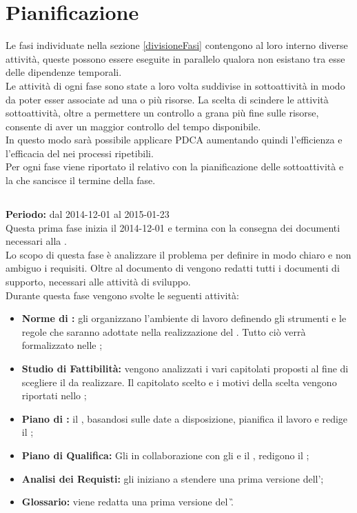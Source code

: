 \section{Pianificazione}\label{piana}
Le fasi individuate nella sezione \ref{divisioneFasi} contengono al loro interno diverse attività, queste possono essere eseguite in parallelo qualora non esistano tra esse delle dipendenze temporali. \\
Le attività di ogni fase sono state a loro volta suddivise in sottoattività in modo da poter esser associate ad una o più risorse.
La scelta di scindere le attività sottoattività, oltre a permettere un controllo a grana più fine sulle risorse, consente di aver un maggior controllo del tempo disponibile. \\
In questo modo sarà possibile applicare PDCA aumentando quindi l'efficienza e l'efficacia del  nei processi ripetibili. \\
Per ogni fase viene riportato il relativo  con la pianificazione delle sottoattività e la  che sancisce il termine della fase.
\subsection{\fAt}
\textbf{Periodo:} dal 2014-12-01 al 2015-01-23 \\
Questa prima fase inizia il 2014-12-01 e termina con la consegna dei documenti necessari alla \RR. \\
Lo scopo di questa fase è analizzare il problema per definire in modo chiaro e non ambiguo i requisiti. Oltre al documento di \AR vengono redatti tutti i documenti di supporto, necessari alle attività di sviluppo. \\
Durante questa fase vengono svolte le seguenti attività:
\begin{itemize}
\item \textbf{Norme di :} gli \rAPs organizzano l'ambiente di lavoro definendo gli strumenti e le regole che saranno adottate nella realizzazione del . Tutto ciò verrà formalizzato nelle \NP;
\item \textbf{Studio di Fattibilità:} vengono analizzati i vari capitolati proposti al fine di scegliere il  da realizzare. Il capitolato scelto e i motivi della scelta vengono riportati nello \SF;
\item \textbf{Piano di :} il \rRP, basandosi sulle date a disposizione, pianifica il lavoro e redige il \PP;
\item \textbf{Piano di Qualifica:} Gli \rAs in collaborazione con gli \rAPs e il \rRP, redigono il \PQ;
\item \textbf{Analisi dei Requisti:} gli \rAs iniziano a stendere una prima versione dell'\AR;
\item \textbf{Glossario:} viene redatta una prima versione del \G.
\end{itemize}
